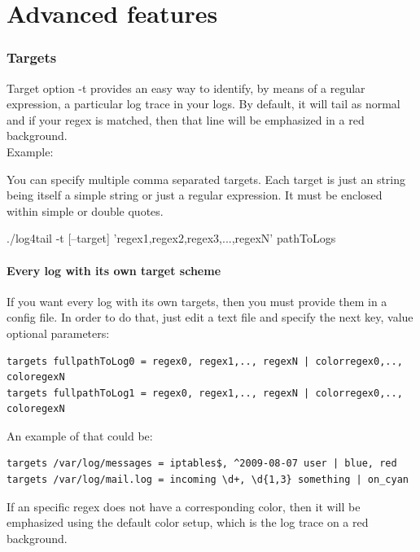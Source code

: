 \part{Advanced features}
\section{Targets}
\label{sec:Targets} Target option -t provides an easy way to identify, by means of a regular
expression, a particular log trace in your logs. By default, it will tail as
normal and if your regex is matched, then that line will be emphasized in a red
background.\\
Example:\\

You can specify multiple comma separated targets. Each target is just an string being 
itself a simple string or just a regular expression. It must be enclosed within simple or 
double quotes.
\begin{cmd}
 ./log4tail -t [--target] 'regex1,regex2,regex3,...,regexN' pathToLogs
\end{cmd}

\subsection{Every log with its own target scheme}
If you want every log with its own targets, then you must provide them in a config file. 
In order to do that, just edit a text file and specify the next key, value optional parameters:

\begin{config}
\begin{verbatim}
targets fullpathToLog0 = regex0, regex1,.., regexN | colorregex0,.., coloregexN
targets fullpathToLog1 = regex0, regex1,.., regexN | colorregex0,.., coloregexN
\end{verbatim}
\end{config}

An example of that could be:

\begin{config}
\begin{verbatim}
targets /var/log/messages = iptables$, ^2009-08-07 user | blue, red
targets /var/log/mail.log = incoming \d+, \d{1,3} something | on_cyan
\end{verbatim}
\end{config}

If an specific regex does not have a corresponding color, then it will be emphasized using
the default color setup, which is the log trace on a red background.



